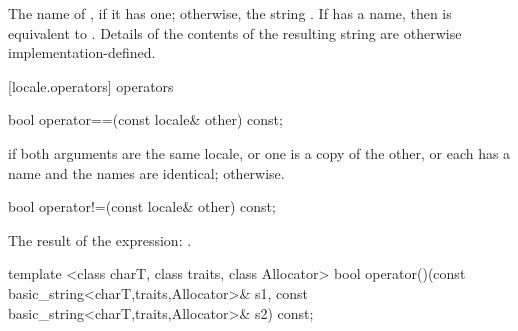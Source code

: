 \begin{itemdescr}
\pnum
\returns
The name of
,
if it has one; otherwise, the string .
If
has a name, then
is equivalent to
.
Details of the contents of the resulting string are otherwise implementation-defined.%
\end{itemdescr}

[locale.operators]{ operators}

%
%
\begin{itemdecl}
bool operator==(const locale& other) const;
\end{itemdecl}

\begin{itemdescr}
\pnum
\returns
{}
if both arguments are the same locale, or one is a copy of the
other, or each has a name and the names are identical;
otherwise.
\end{itemdescr}

%
%
\begin{itemdecl}
bool operator!=(const locale& other) const;
\end{itemdecl}

\begin{itemdescr}
\pnum
\returns
The result of the expression:
.
\end{itemdescr}

%
%
\begin{itemdecl}
template <class charT, class traits, class Allocator>
  bool operator()(const basic_string<charT,traits,Allocator>& s1,
                  const basic_string<charT,traits,Allocator>& s2) const;
\end{itemdecl}

